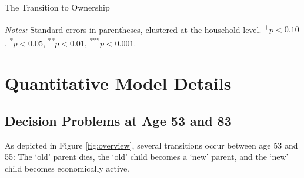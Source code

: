 \documentclass[12pt]{article}
\begin{document}
\begin{table}
	\center
	\begin{threeparttable}
		\caption{The Transition to Ownership}
		\label{tab:newowners}
		\small 
				

		{\begin{footnotesize}\begin{flushleft}
		\textit{Notes:} Standard errors in parentheses, clustered at the household level. \textsuperscript{+}$p<0.10$, \textsuperscript{*}$p<0.05$, \textsuperscript{**}$p<0.01$, \textsuperscript{***}$p<0.001$.
		\end{flushleft}\end{footnotesize}}		
	\end{threeparttable}
\end{table}


\section{Quantitative Model Details} 

\subsection{Decision Problems at Age 53 and 83}\label{sec:decextra}
As depicted in Figure \ref{fig:overview}, several transitions occur between age 53 and 55: The `old' parent dies, the `old' child becomes a `new' parent, and the `new' child becomes economically active. 
\end{document}
